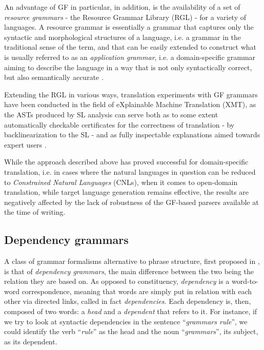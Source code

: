 An advantage of GF in particular, in addition, is the availability of a set of \textit{resource grammars} - the Resource Grammar Library (RGL) - for a variety of languages. A resource grammar is essentially a grammar that captures only the syntactic and morphological structures of a language, i.e. a grammar in the traditional sense of the term, and that can be easily extended to construct what is usually referred to as an \textit{application grammar}, i.e. a domain-specific grammar aiming to describe the language in a way that is not only syntactically correct, but also semantically accurate \cite{gfbook}. \smallskip

Extending the RGL in various ways, translation experiments with GF grammars have been conducted in the field of eXplainable Machine Translation (XMT), as the ASTs produced by SL analysis can serve both as to some extent automatically checkable certificates for the correctness of translation - by backlinearization to the SL - and as fully inspectable explanations aimed towards expert users \cite{rantaxmt}. \smallskip

While the approach described above has proved successful for domain-specific translation, i.e. in cases where the natural languages in question can be reduced to \textit{Constrained Natural Languages} (CNLs), when it comes to open-domain translation, while target language generation remains effective, the results are negatively affected by the lack of robustness of the GF-based parsers available at the time of writing.

\subsection{Dependency grammars} \label{depg}
A class of grammar formalisms alternative to phrase structure, first proposed in \cite{dg}, is that of \textit{dependency grammars}, the main difference between the two being the relation they are based on. 
As opposed to constituency, \textit{dependency} is a word-to-word correspondence, meaning that words are simply put in relation with each other via directed links, called in fact \textit{dependencies}. 
Each dependency is, then, composed of two words: a \textit{head} and a \textit{dependent} that refers to it. For instance, if we try to look at syntactic dependencies in the sentence ``\textit{grammars rule}'', we could identify the verb ``\textit{rule}'' as the head and the noun ``\textit{grammars}'', its subject, as its dependent. \smallskip 

